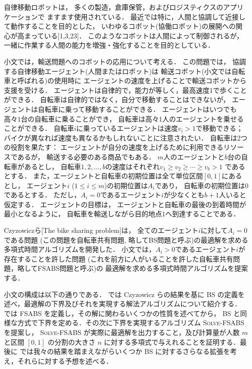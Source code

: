 
自律移動ロボットは，
多くの製造，倉庫保管，およびロジスティクスのアプリケーションで
ますます使用されている．
最近では特に，人間と協調して近接して動作することを目的とした，
いわゆるコボット(協働ロボット)の展開への関心が高まっている[1,3,23]．
このようなコボットは人間によって制御されるが，
一緒に作業する人間の能力を増強・強化することを目的としている．

小文では，輸送問題へのコボットの応用について考える．
この問題では，
協調する自律移動エージェント(人間またはロボット)は
輸送コボット(小文では自転車と呼ばれる)の使用時に
エージェントの速度を上げることで輸送コボットから支援を受ける．
エージェントは自律的で，能力が等しく，最高速度1で歩くことができる．
自転車は自律的ではなく，自分で移動することはできないが，
エージェントは自転車に乗って移動することができる．
エージェントはいつでも高々$1$台の自転車に乗ることができ，
自転車は高々1人のエージェントを乗せることができる．
自転車$i$に乗っているエージェントは速度$v_i>1$で移動できる；
バイクが異なれば速度も異なるかもしれないことに注意されたい．
自転車は2つの役割を果たす：
エージェントが自分の速度を上げるために利用できるリソースであるが，
輸送する必要のある商品でもある．
$m$人のエージェントと$b$台の自転車があるとし，
自転車$1,2,\ldots,b$の速度はそれぞれ$v_1\ge v_2\ge\cdots\ge v_b>1$
であるとする．
また，エージェントと自転車の初期位置は全て単位区間$[0,1]$にあるとし，
エージェント$i$ ($1\le i\le m$)の初期位置は$A_i$であり，
自転車の初期位置は$0$であるとする．
ただし，$A_i=0$であるエージェント$i$が少なくとも$b+1$人いると仮定する．
エージェントの目標は，
エージェントと自転車の最後の到着時間が最小となるように，
自転車を輸送しながら目的地点$1$へ到達することである．

Czyzowiczら[The bike sharing problem]は，
全てのエージェント$i$に対して$A_i=0$である問題
(この問題を自転車共有問題, 略してBS問題と呼ぶ)の最適解を求める
多項式時間アルゴリズムを開発した．
小文では，$A_i>0$であるエージェント$i$が存在することを許した問題
(これを前方に人がいることを許した自転車共有問題，略してFSABS問題と呼ぶ)の
最適解を求める多項式時間アルゴリズムを提案する．

小文の構成は以下の通りである． では Czyzowicz らの結果を基に BS の定義を述べ，最適解の下界及びそれを実現する解法アルゴリズムについて紹介する． では FSABS を定義し，その解に関わるいくつかの性質を述べてから， BS と同様な方式で下界を定める．その次に下界を実現するアルゴリズム \textsc{Solve-FSABS} を提案し， \textsc{Solve-FSABS} が実際に最適解を出力すること，及び計算量が人数 $m$ と区間 $[0, 1]$ の分割の大きさ $n$ に対する多項式で与えれることを証明する．最後に  では我々の結果を踏まえながらいくつか BS に対するさらなる拡張を考え，それらに対する予想を述べる．


